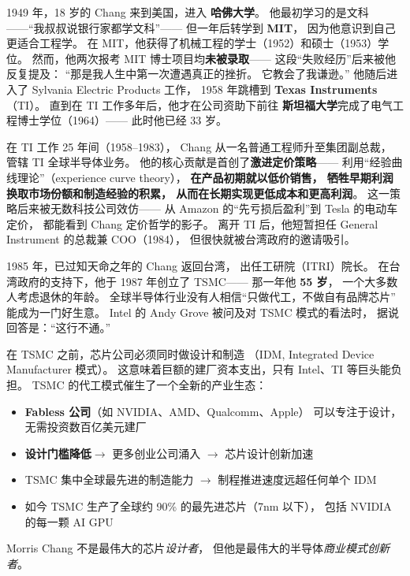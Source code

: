 \begin{corebox}
1949 年，18 岁的 Chang 来到美国，进入 \textbf{哈佛大学}。
他最初学习的是文科——``我叔叔说银行家都学文科''——
但一年后转学到 \textbf{MIT}，
因为他意识到自己更适合工程学。
在 MIT，他获得了机械工程的学士（1952）和硕士（1953）学位。
然而，他两次报考 MIT 博士项目均\textbf{未被录取}——
这段``失败经历''后来被他反复提及：
``那是我人生中第一次遭遇真正的挫折。
它教会了我谦逊。''
他随后进入了 Sylvania Electric Products 工作，
1958 年跳槽到 \textbf{Texas Instruments}（TI）。
直到在 TI 工作多年后，他才在公司资助下前往
\textbf{斯坦福大学}完成了电气工程博士学位（1964）——
此时他已经 33 岁。
\end{corebox}

在 TI 工作 25 年间（1958--1983），
Chang 从一名普通工程师升至集团副总裁，
管辖 TI 全球半导体业务。
他的核心贡献是首创了\textbf{激进定价策略}——
利用``经验曲线理论''（experience curve theory），
\textbf{在产品初期就以低价销售，
牺牲早期利润换取市场份额和制造经验的积累，
从而在长期实现更低成本和更高利润}。
这一策略后来被无数科技公司效仿——
从 Amazon 的``先亏损后盈利''到 Tesla 的电动车定价，
都能看到 Chang 定价哲学的影子。
离开 TI 后，他短暂担任 General Instrument 的总裁兼 COO（1984），
但很快就被台湾政府的邀请吸引。

1985 年，已过知天命之年的 Chang 返回台湾，
出任工研院（ITRI）院长。
在台湾政府的支持下，他于 1987 年创立了 TSMC——
那一年他 \textbf{55 岁}，
一个大多数人考虑退休的年龄。
全球半导体行业没有人相信``只做代工，不做自有品牌芯片''
能成为一门好生意。
Intel 的 Andy Grove 被问及对 TSMC 模式的看法时，
据说回答是：``这行不通。''

\begin{corebox}
在 TSMC 之前，芯片公司必须同时做设计和制造
（IDM, Integrated Device Manufacturer 模式）。
这意味着巨额的建厂资本支出，只有 Intel、TI 等巨头能负担。
TSMC 的代工模式催生了一个全新的产业生态：
\begin{itemize}[noitemsep]
  \item \textbf{Fabless 公司}（如 NVIDIA、AMD、Qualcomm、Apple）
        可以专注于设计，无需投资数百亿美元建厂
  \item \textbf{设计门槛降低}$\to$ 更多创业公司涌入
        $\to$ 芯片设计创新加速
  \item TSMC 集中全球最先进的制造能力
        $\to$ 制程推进速度远超任何单个 IDM
  \item 如今 TSMC 生产了全球约 90\% 的最先进芯片（7nm 以下），
        包括 NVIDIA 的每一颗 AI GPU
\end{itemize}
Morris Chang 不是最伟大的芯片\textit{设计者}，
但他是最伟大的半导体\textit{商业模式创新者}。
\end{corebox}

